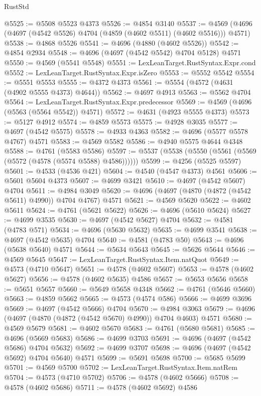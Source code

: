 \begin{lexlean}{RustStd}
\begin{coremodule}
@5525 := @5508 @5523 @4373
@5526 := @4854 @3140
@5537 := @4569 (@4696 (@4697 (@4542 @5526) @4704 (@4859 (@4602 @5511) (@4602 @5516))) @4571)
@5538 := @4868 @5526
@5541 := @4696 (@4880 (@4602 @5526))
@5542 := @4854 @2934
@5548 := @4696 (@4697 (@4542 @5542) @4704 @5128) @4571
@5550 := @4569 (@5541 @5548)
@5551 := LexLeanTarget.RustSyntax.Expr.cond
@5552 := LexLeanTarget.RustSyntax.Expr.isZero
@5553 := @5552 @5542
@5554 := @5551 @5553
@5555 := @4372 @4373
@5561 := @5554 (@4572 (@4631 (@4902 @5555 @4373) @4644))
@5562 := @4697 @4913
@5563 := @5562 @4704
@5564 := LexLeanTarget.RustSyntax.Expr.predecessor
@5569 := @4569 (@4696 (@5563 (@5564 @5542)) @4571)
@5572 := @4631 (@4923 @5555 @4373)
@5573 := @5127 @4912
@5574 := @4859 @5573
@5575 := @4928 @3035
@5577 := @4697 (@4542 @5575)
@5578 := @4933 @4363
@5582 := @4696 (@5577 @5578 @4767) @4571
@5583 := @4569 @5582
@5586 := @4940 @5575 @4644 @4348
@5588 := @4761 (@5583 @5586)
@5597 := @5537 (@5538 (@5550 (@5561 (@5569 (@5572 (@4578 (@5574 @5588) @4586))))))
@5599 := @4256 (@5525 @5597)
@5601 := @4533 (@4536 @421)
@5604 := @4540 (@4547 @4373) @4561
@5606 := @5601 @5604 @4373
@5607 := @4699 @3421
@5610 := @4697 (@4542 @5607) @4704
@5611 := @4984 @3049
@5620 := @4696 (@4697 (@4870 (@4872 (@4542 @5611) @4990)) @4704 @4767) @4571
@5621 := @4569 @5620
@5622 := @4602 @5611
@5624 := @4761 (@5621 @5622)
@5626 := @4696 (@5610 @5624)
@5627 := @4699 @3535
@5630 := @4697 (@4542 @5627) @4704
@5632 := @4581 (@4783 @571)
@5634 := @4696 (@5630 @5632)
@5635 := @4699 @3541
@5638 := @4697 (@4542 @5635) @4704
@5640 := @4581 (@4783 @50)
@5643 := @4696 (@5638 @5640) @4571
@5644 := @5634 @5643
@5645 := @5626 @5644
@5646 := @4569 @5645
@5647 := LexLeanTarget.RustSyntax.Item.natQuot
@5649 := @4573 (@4710 @5647)
@5651 := @4578 (@4602 @5607)
@5653 := @4578 (@4602 @5627)
@5656 := @4578 (@4602 @5635) @4586
@5657 := @5653 @5656
@5658 := @5651 @5657
@5660 := @5649 @5658 @4348
@5662 := @4761 (@5646 @5660)
@5663 := @4859 @5662
@5665 := @4573 (@4574 @586)
@5666 := @4699 @3696
@5669 := @4697 (@4542 @5666) @4704
@5670 := @4984 @3063
@5679 := @4696 (@4697 (@4870 (@4872 (@4542 @5670) @4990)) @4704 @4603) @4571
@5680 := @4569 @5679
@5681 := @4602 @5670
@5683 := @4761 (@5680 @5681)
@5685 := @4696 (@5669 @5683)
@5686 := @4699 @3703
@5691 := @4696 (@4697 (@4542 @5686) @4704 @5632)
@5692 := @4699 @3707
@5698 := @4696 (@4697 (@4542 @5692) @4704 @5640) @4571
@5699 := @5691 @5698
@5700 := @5685 @5699
@5701 := @4569 @5700
@5702 := LexLeanTarget.RustSyntax.Item.natRem
@5704 := @4573 (@4710 @5702)
@5706 := @4578 (@4602 @5666)
@5708 := @4578 (@4602 @5686)
@5711 := @4578 (@4602 @5692) @4586

\end{coremodule}
\end{lexlean}
